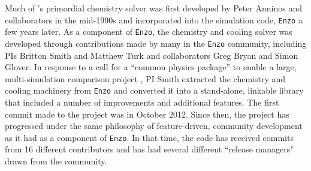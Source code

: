 Much of \grackle{}'s primordial chemistry solver was first developed
by Peter Anninos and collaborators in the mid-1990s
\citep{1997NewA....2..209A, 1997NewA....2..181A} and incorporated into
the simulation code, \texttt{Enzo} \citep[][licensed under the
  3-clause, revised BSD license]{2014ApJS..211...19B} a few
years later.  As a component of \texttt{Enzo}, the chemistry and
cooling solver was developed through contributions made by many in the
\texttt{Enzo} community, including PIs Britton Smith and Matthew Turk
and collaborators Greg Bryan and Simon Glover.  In response to a call for
a ``common physics package'' to enable a large, multi-simulation
comparison project \citep[AGORA,][]{2014ApJS..210...14K,
  2016ApJ...833..202K}, PI Smith extracted the chemistry and
cooling machinery from \texttt{Enzo} and converted it into a
stand-alone, linkable library that included a number of improvements
and additional features.  The first commit made to the \grackle{}
project was in October 2012.  Since then, the project has progressed
under the same philosophy of feature-driven, community development as
it had as a component of \texttt{Enzo}.  In that time, the code has
received commits from 16 different contributors and has had several different
``release managers" drawn from the community.

